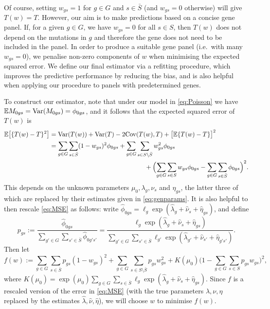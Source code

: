 \documentclass[../thesis.tex]{subfiles}
\begin{document}
Of course, setting $w_{gs}= 1$ for $g \in G$ and $s \in \bar{S}$ (and $w_{gs} = 0$ otherwise) will give $T(w) = T$.  However, our aim is to make predictions based on a concise gene panel. If, for a given $g \in G$, we have $w_{gs} = 0$ for all $s \in S$, then $T(w)$ does not depend on the mutations in $g$ and therefore the gene does not need to be included in the panel. In order to produce a suitable gene panel (i.e.~with many $w_{gs} = 0$), we penalise non-zero components of $w$ when minimising the expected squared error. We define our final estimator via a refitting procedure, which improves the predictive performance by reducing the bias, and is also helpful when applying our procedure to panels with predetermined genes.

To construct our estimator, note that under our model in \eqref{eq:Poisson} we have $\mathbb{E}M_{0gs} = \mathrm{Var}(M_{0gs}) = \phi_{0gs}$, and it follows that the expected squared error of $T(w)$ is
\begin{align}
\label{eq:MSE}
\mathbb{E}\bigl[\{T(w) - T\}^2\bigr] & = \mathrm{Var}(T(w)) + \mathrm{Var}(T) - 2\mathrm{Cov}(T(w), T) + \bigl[\mathbb{E}\{T(w) - T\}\bigr]^2  \nonumber \\
& = \sum_{g \in G} \sum_{s \in \bar{S}}(1- w_{gs})^2\phi_{0gs} + \sum_{g \in G} \sum_{s \in S \setminus \bar{S}}w_{gs}^2\phi_{0gs}  \nonumber \\ & \hspace{150pt} + \Bigl(\sum_{g \in G}\sum_{s \in S}w_{gs}\phi_{0gs}
- \sum_{g \in G} \sum_{s \in \bar{S}}\phi_{0gs} \Bigr)^2.
\end{align} 
This depends on the unknown parameters $\mu_0, \lambda_g, \nu_s$ and $\eta_{gs}$, the latter three of which are replaced by their estimates given in \eqref{eq:genparams}.  It is also helpful to then rescale  \eqref{eq:MSE} as follows: write $\hat{\phi}_{0gs} = \ell_g\exp(\hat{\lambda}_g + \hat{\nu}_s + \hat{\eta}_{gs})$, and define
\[
p_{gs}  := \frac{\hat{\phi}_{0gs}}{\sum_{g' \in G} \sum_{s' \in \bar{S}} \hat{\phi}_{0g's'}} = \frac{\ell_g \exp(\hat{\lambda}_g + \hat{\nu}_s + \hat{\eta}_{gs})}{\sum_{g'\in G} \sum_{s'\in \bar{S}} \ell_{g'} \exp(\hat{\lambda}_{g'} + \hat{\nu}_{s'} + \hat{\eta}_{g's'})}.
\]
Then let
\[
f(w) := \sum_{g \in G}\sum_{s \in \bar{S}} p_{gs}(1-w_{gs})^2  + \sum_{g \in G}\sum_{ s\in S \setminus \bar{S}}p_{gs} w_{gs}^2 + K(\mu_0)\big( 1 - \sum_{g \in G}\sum_{s \in S}  p_{gs}w_{gs} \big)^2,
\]
where $K(\mu_0) = \exp(\mu_0)\sum_{g \in G}\sum_{s \in \bar{S}} \ell_{g}\exp(\hat{\lambda}_g + \hat{\nu}_s + \hat{\eta}_{gs})$. Since $f$ is a rescaled version of the error in \eqref{eq:MSE} (with the true parameters $\lambda, \nu, \eta$ replaced by the estimates $\hat{\lambda}, \hat{\nu}, \hat{\eta}$), we will choose $w$ to minimise $f(w)$.  
\end{document}

